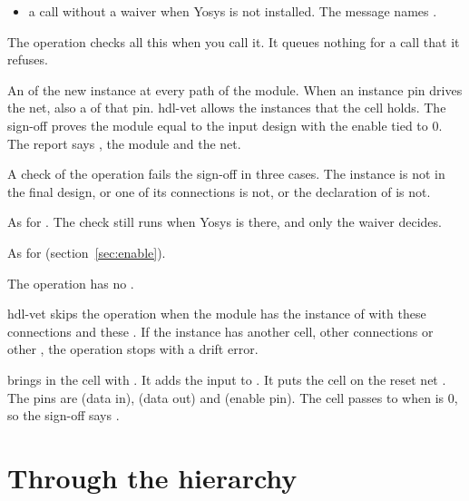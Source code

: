 \begin{entry}{}
\begin{itemize}
    write it
  \item a call without a waiver when Yosys is not installed. The message names
    .
  \end{itemize}
  The operation checks all this when you call it. It queues nothing for a call that it
  refuses.
\item[Sign-off requires] An  of the new instance at every path of the
  module. When an instance pin drives the net, also a  of that pin.
  hdl-vet allows the instances that the cell holds. The sign-off proves the module equal to
  the input design with the enable tied to 0. The report says ,
  the module and the net. 

  A check of the operation fails the sign-off in three cases. The
  instance is not in the final design, or one of its connections is not, or the
  declaration of  is not.
\item[Waiver] As for . The check still runs when Yosys is
  there, and only the waiver decides.
\item[The way of the enable] As for  (section~\ref{sec:enable}).
\item[was] The operation has no .
\item[Again] hdl-vet skips the operation when the module has the instance  of
   with these connections and these . If the instance has another
  cell, other connections or other , the operation stops with a drift error.
\item[Example]  brings in the cell  with
  . It adds the input  to . It puts the
  cell on the reset net . The pins are  (data in),  (data
  out) and  (enable pin). The cell passes  to  when  is
  0, so the sign-off says .
\end{entry}






\section{Through the hierarchy}

